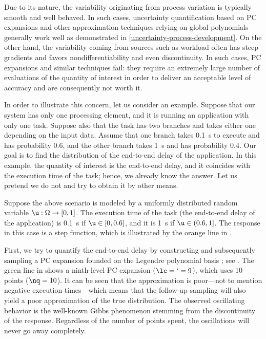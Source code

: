Due to its nature, the variability originating from process variation is
typically smooth and well behaved. In such cases, uncertainty quantification
based on \ac{PC} expansions \cite{xiu2010} and other approximation techniques
relying on global polynomials generally work well as demonstrated in
\cref{uncertainty-process-development}. On the other hand, the variability
coming from sources such as workload often has steep gradients and favors
nondifferentiability and even discontinuity. In such cases, \ac{PC} expansions
and similar techniques fail: they require an extremely large number of
evaluations of the quantity of interest in order to deliver an acceptable level
of accuracy and are consequently not worth it.

In order to illustrate this concern, let us consider an example. Suppose that
our system has only one processing element, and it is running an application
with only one task. Suppose also that the task has two branches and takes either
one depending on the input data. Assume that one branch takes 0.1~s to execute
and has probability 0.6, and the other branch takes 1~s and has probability 0.4.
Our goal is to find the distribution of the end-to-end delay of the application.
In this example, the quantity of interest is the end-to-end delay, and it
coincides with the execution time of the task; hence, we already know the
answer. Let us pretend we do not and try to obtain it by other means.

Suppose the above scenario is modeled by a uniformly distributed random variable
$\u: \Omega \to [0, 1]$. The execution time of the task (the end-to-end delay of
the application) is 0.1~s if $\u \in [0, 0.6]$, and it is 1~s if $\u \in (0.6,
1]$. The response in this case is a step function, which is illustrated by the
orange line in .

First, we try to quantify the end-to-end delay by constructing and subsequently
sampling a \ac{PC} expansion founded on the Legendre polynomial basis
\cite{xiu2010}; see . The green line in
 shows a ninth-level \ac{PC} expansion ($\lc = \lq = 9$),
which uses 10 points ($\nq = 10$). It can be seen that the approximation is
poor---not to mention negative execution times---which means that the follow-up
sampling will also yield a poor approximation of the true distribution. The
observed oscillating behavior is the well-known Gibbs phenomenon stemming from
the discontinuity of the response. Regardless of the number of points spent, the
oscillations will never go away completely.

